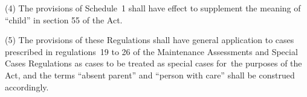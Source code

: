 \documentclass[a4paper,12pt]{article}
\begin{document}
%
%
%
%

(4) The provisions of Schedule~1 shall have effect to supplement the meaning of “child” in section 55 of the Act.

(5) The provisions of these Regulations shall have general application to cases prescribed in regulations~19 to 26 of the Maintenance Assessments and Special Cases Regulations as cases to be treated as special cases for~the purposes of the Act, and the terms “absent parent” and “person with care” shall be construed accordingly.
\end{document}
